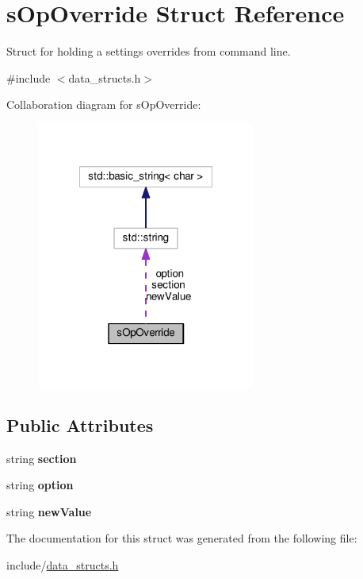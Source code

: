 \hypertarget{structsOpOverride}{\section{s\-Op\-Override \-Struct \-Reference}
\label{d2/d28/structsOpOverride}
}


\-Struct for holding a settings overrides from command line.  




{\ttfamily \#include $<$data\-\_\-structs.\-h$>$}



\-Collaboration diagram for s\-Op\-Override\-:\nopagebreak
\begin{figure}[H]
\begin{center}
\leavevmode
\includegraphics[width=204pt]{d5/d1e/structsOpOverride__coll__graph}
\end{center}
\end{figure}
\subsection*{\-Public \-Attributes}
\begin{DoxyCompactItemize}
\item 
\hypertarget{structsOpOverride_a4620283115615d0c3d5e7cd1050e2594}{string {\bfseries section}}\label{d2/d28/structsOpOverride_a4620283115615d0c3d5e7cd1050e2594}

\item 
\hypertarget{structsOpOverride_a07eef5f58cccc720b8779df250674ae2}{string {\bfseries option}}\label{d2/d28/structsOpOverride_a07eef5f58cccc720b8779df250674ae2}

\item 
\hypertarget{structsOpOverride_ad318da346965eb8ec241f744690f6db8}{string {\bfseries new\-Value}}\label{d2/d28/structsOpOverride_ad318da346965eb8ec241f744690f6db8}

\end{DoxyCompactItemize}


\-The documentation for this struct was generated from the following file\-:\begin{DoxyCompactItemize}
\item 
include/\hyperlink{data__structs_8h}{data\-\_\-structs.\-h}\end{DoxyCompactItemize}
